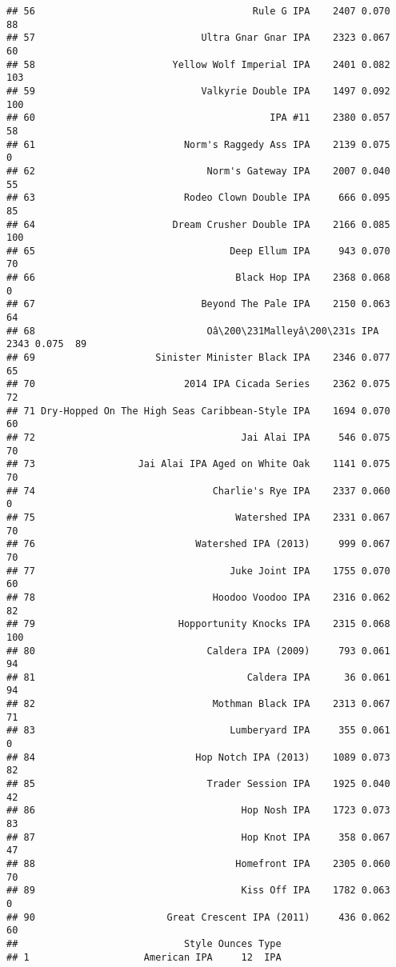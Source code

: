 \documentclass[
]{article}
\begin{document}
\begin{verbatim}
## 56                                      Rule G IPA    2407 0.070  88
## 57                             Ultra Gnar Gnar IPA    2323 0.067  60
## 58                        Yellow Wolf Imperial IPA    2401 0.082 103
## 59                             Valkyrie Double IPA    1497 0.092 100
## 60                                         IPA #11    2380 0.057  58
## 61                          Norm's Raggedy Ass IPA    2139 0.075   0
## 62                              Norm's Gateway IPA    2007 0.040  55
## 63                          Rodeo Clown Double IPA     666 0.095  85
## 64                        Dream Crusher Double IPA    2166 0.085 100
## 65                                  Deep Ellum IPA     943 0.070  70
## 66                                   Black Hop IPA    2368 0.068   0
## 67                             Beyond The Pale IPA    2150 0.063  64
## 68                              Oâ\200\231Malleyâ\200\231s IPA    2343 0.075  89
## 69                     Sinister Minister Black IPA    2346 0.077  65
## 70                          2014 IPA Cicada Series    2362 0.075  72
## 71 Dry-Hopped On The High Seas Caribbean-Style IPA    1694 0.070  60
## 72                                    Jai Alai IPA     546 0.075  70
## 73                  Jai Alai IPA Aged on White Oak    1141 0.075  70
## 74                               Charlie's Rye IPA    2337 0.060   0
## 75                                   Watershed IPA    2331 0.067  70
## 76                            Watershed IPA (2013)     999 0.067  70
## 77                                  Juke Joint IPA    1755 0.070  60
## 78                               Hoodoo Voodoo IPA    2316 0.062  82
## 79                         Hopportunity Knocks IPA    2315 0.068 100
## 80                              Caldera IPA (2009)     793 0.061  94
## 81                                     Caldera IPA      36 0.061  94
## 82                               Mothman Black IPA    2313 0.067  71
## 83                                  Lumberyard IPA     355 0.061   0
## 84                            Hop Notch IPA (2013)    1089 0.073  82
## 85                              Trader Session IPA    1925 0.040  42
## 86                                    Hop Nosh IPA    1723 0.073  83
## 87                                    Hop Knot IPA     358 0.067  47
## 88                                   Homefront IPA    2305 0.060  70
## 89                                    Kiss Off IPA    1782 0.063   0
## 90                       Great Crescent IPA (2011)     436 0.062  60
##                             Style Ounces Type
## 1                    American IPA     12  IPA

\end{verbatim}
\end{document}
